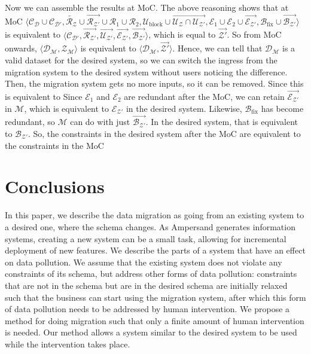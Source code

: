 \documentclass[runningheads]{llncs}
\newcommand{\pair}[2]{\langle{#1},{#2}\rangle}
\newcommand{\concepts}{\mathcal{C}}
\newcommand{\rels}{\mathcal{R}}   %
\newcommand{\rules}{\mathcal{U}}
\newcommand{\transactions}{\mathcal{E}}
\newcommand{\busConstraints}{\mathcal{B}}
\newcommand{\dataset}{\mathscr{D}}
\newcommand{\schema}{\mathscr{Z}}
\newcommand{\migrsys}{\mathscr{M}}
\begin{document}
   Now we can assemble the results at MoC.
   The above reasoning shows that at MoC
   $\langle\concepts_\dataset\cup\concepts_{\dataset'},
   \overleftarrow{\rels_{\schema}}\cup\overrightarrow{\rels_{\schema'}}\cup\rels_1\cup\rels_2,
   \rules_\text{block}\cup\overrightarrow{\rules_{\schema}\cap\rules_{\schema'}},
   \transactions_1\cup\transactions_2\cup\overrightarrow{\transactions_{\schema'}},
   \busConstraints_\text{fix}\cup\overrightarrow{\busConstraints_{\schema'}}\rangle$ is equivalent to 
   $\langle\concepts_{\dataset'}, \overrightarrow{\rels_{\schema'}}, \overrightarrow{\rules_{\schema'}}, \overrightarrow{\transactions_{\schema'}}, \overrightarrow{\busConstraints_{\schema'}}\rangle$,
   which is equal to $\overrightarrow{\schema'}$.
   So from MoC onwards, $\pair{\dataset_{\migrsys}}{\schema_{\migrsys}}$ is equivalent to $\pair{\dataset_{\migrsys}}{\overrightarrow{\schema'}}$.
   Hence, we can tell that $\dataset_{\migrsys}$ is a valid dataset for the desired system, so we can switch the ingress from the migration system to the desired system without users noticing the difference.
   Then, the migration system gets no more inputs, so it can be removed. 
   Since this is equivalent to 
   Since $\transactions_1$ and $\transactions_2$ are redundant after the MoC,
   we can retain $\overrightarrow{\transactions_{\schema'}}$ in $\migrsys$,
   which is equivalent to $\transactions_{\schema'}$ in the desired system.
   Likewise, $\busConstraints_\text{fix}$ has become redundant, so $\migrsys$ can do with just $\overrightarrow{\busConstraints_{\schema'}}$.
   In the desired system, that is equivalent to $\busConstraints_{\schema'}$.
   So, the constraints in the desired system after the MoC are equivalent to the constraints in the MoC


\section{Conclusions}
\label{sct:Conclusions}
   In this paper, we describe the data migration as going from an existing system to a desired one, where the schema changes.
   As Ampersand generates information systems, creating a new system can be a small task, allowing for incremental deployment of new features.
   We describe the parts of a system that have an effect on data pollution.
   We assume that the existing system does not violate any constraints of its schema, but address other forms of data pollution:
   constraints that are not in the schema but are in the desired schema are initially relaxed such that the business can start using the migration system, after which this form of data pollution needs to be addressed by human intervention.
   We propose a method for doing migration such that only a finite amount of human intervention is needed.
   Our method allows a system similar to the desired system to be used while the intervention takes place.
\end{document}
